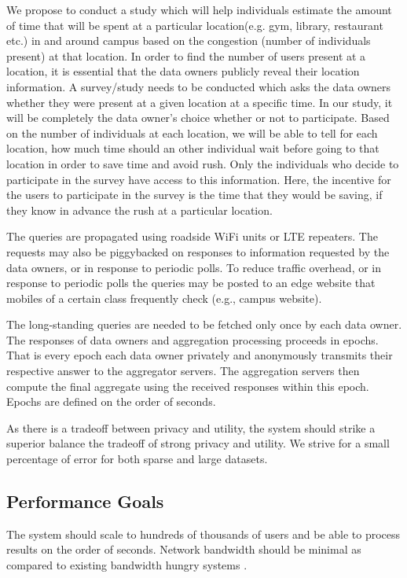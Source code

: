 \documentclass[conference]{IEEEtran}
\begin{document}
We propose to conduct a study which will help individuals estimate the amount of time that will be spent at a particular location(e.g. gym, library, restaurant etc.) in and around campus based on the congestion (number of individuals present) at that location. In order to find the number of users present at a location, it is essential that the data owners publicly reveal their location information. A survey/study needs to be conducted which asks the data owners whether they were present at a given location at a specific time. In our study, it will be completely the data owner's choice whether or not to participate. Based on the number of individuals at each location, we will be able to tell for each location, how much time should an other individual wait before going to that location in order to save time and avoid rush. Only the individuals who decide to participate in the survey have access to this information. Here, the incentive for the users to participate in the survey is the time that they would be saving, if they know in advance the rush at a particular location.

The queries are propagated using roadside WiFi units or LTE repeaters. The requests may also be piggybacked on responses to information requested by the data owners, or in response to periodic polls. To reduce traffic overhead, or in response to periodic polls the queries may be posted to an edge website that mobiles of a certain class frequently check (e.g., campus  website).

The long-standing queries are needed to be fetched only once by each data owner. The responses of data owners and aggregation processing proceeds in epochs. That is every epoch each data owner privately and anonymously transmits their respective answer to the aggregator servers. The aggregation servers then compute the final aggregate using the received responses within this epoch. Epochs are defined on the order of seconds.

As there is a tradeoff between privacy and utility, the system should strike a superior balance the tradeoff of strong privacy and utility. We strive for a small percentage of error for both sparse and large datasets.

\subsection{Performance Goals}

The system should scale to hundreds of thousands of users and be able to process results on the order of seconds. Network bandwidth should be minimal as compared to existing bandwidth hungry systems \cite{DBLP:journals/joc/Chaum88,DBLP:conf/sosp/HooffLZZ15}.
\end{document}
